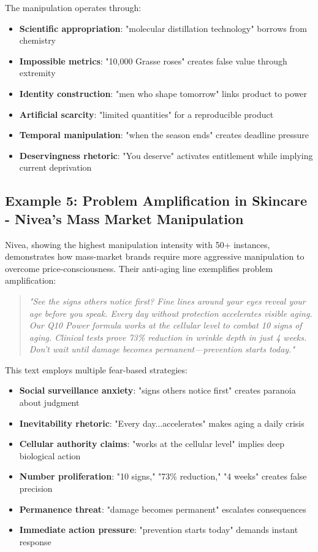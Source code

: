 The manipulation operates through:
\begin{itemize}
\item \textbf{Scientific appropriation}: "molecular distillation technology" borrows from chemistry
\item \textbf{Impossible metrics}: "10,000 Grasse roses" creates false value through extremity
\item \textbf{Identity construction}: "men who shape tomorrow" links product to power
\item \textbf{Artificial scarcity}: "limited quantities" for a reproducible product
\item \textbf{Temporal manipulation}: "when the season ends" creates deadline pressure
\item \textbf{Deservingness rhetoric}: "You deserve" activates entitlement while implying current deprivation
\end{itemize}

\subsection{Example 5: Problem Amplification in Skincare - Nivea's Mass Market Manipulation}

Nivea, showing the highest manipulation intensity with 50+ instances, demonstrates how mass-market brands require more aggressive manipulation to overcome price-consciousness. Their anti-aging line exemplifies problem amplification:

\begin{quote}
\textit{"See the signs others notice first? Fine lines around your eyes reveal your age before you speak. Every day without protection accelerates visible aging. Our Q10 Power formula works at the cellular level to combat 10 signs of aging. Clinical tests prove 73\% reduction in wrinkle depth in just 4 weeks. Don't wait until damage becomes permanent—prevention starts today."}
\end{quote}

This text employs multiple fear-based strategies:
\begin{itemize}
\item \textbf{Social surveillance anxiety}: "signs others notice first" creates paranoia about judgment
\item \textbf{Inevitability rhetoric}: "Every day...accelerates" makes aging a daily crisis
\item \textbf{Cellular authority claims}: "works at the cellular level" implies deep biological action
\item \textbf{Number proliferation}: "10 signs," "73\% reduction," "4 weeks" creates false precision
\item \textbf{Permanence threat}: "damage becomes permanent" escalates consequences
\item \textbf{Immediate action pressure}: "prevention starts today" demands instant response
\end{itemize}


